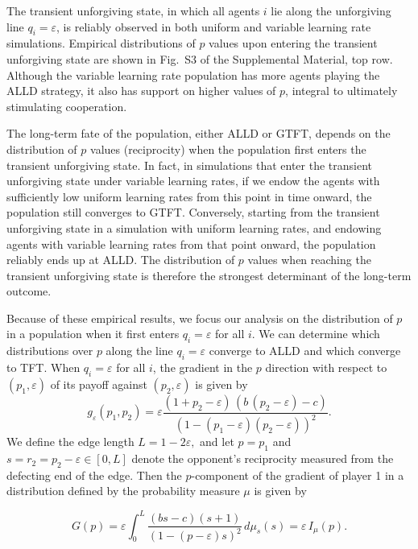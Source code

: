 \documentclass[10pt]{article}
\makeatletter
\newcommand{\eps}{\varepsilon}
\renewcommand\subsection{\@startsection{subsection}{2}{\z@}{-2.5ex \@plus -1ex \@minus -.2ex}{1ex \@plus .2ex}{\sffamily\bfseries\large}}
\makeatother
\begin{document}
\subsection{Transient Unforgiving State}

The transient unforgiving state, in which all agents $i$ lie along the unforgiving line $q_i = \eps$, is reliably observed in both uniform and variable learning rate simulations.
Empirical distributions of $p$ values upon entering the transient unforgiving state are shown in Fig.~S3 of the Supplemental Material, top row. Although the variable learning rate population has more agents playing the ALLD strategy, it also has support on higher values of $p$, integral to ultimately stimulating cooperation.

The long-term fate of the population, either ALLD or GTFT, depends on the distribution of $p$ values (reciprocity) when the population first enters the transient unforgiving state. In fact, in simulations that enter the transient unforgiving state under variable learning rates, if we endow the agents with sufficiently low uniform learning rates from this point in time onward, the population still converges to GTFT. Conversely, starting from the transient unforgiving state in a simulation with uniform learning rates, and endowing agents with variable learning rates from that point onward, the population reliably ends up at ALLD. The distribution of $p$ values when reaching the transient unforgiving state is therefore the strongest determinant of the long-term outcome.

Because of these empirical results, we focus our analysis on the distribution of $p$ in a population when it first enters $q_i = \eps$ for all $i$.
We can determine which distributions over $p$ along the line $q_i= \eps$ converge to ALLD and which converge to TFT. When $q_i = \eps$ for all $i$, the gradient in the $p$ direction with respect to $(p_1, \eps)$ of its payoff against $(p_2, \eps)$ is given by
\[g_\eps(p_1, p_2) = \eps \frac{(1 + p_2 - \eps)\, \left( b\,(p_2 - \eps) - c\right)}{\left(1 - (p_1 -\eps)(p_2 - \eps)\right)^2}.
\]
We define the edge length $L = 1-2\eps,$ and let $p = p_1$ and $s = r_2 = p_2-\eps \in [0,L]$ denote the opponent's reciprocity measured from the defecting end of the edge. Then the $p$-component of the gradient of player 1 in a distribution defined by the probability measure $\mu$ is given by

\[G(p) = \eps \int_0^L \frac{(bs-c)(s+1)}{(1-(p-\eps)s)^2} \, d\mu_s(s) = \eps \, I_\mu(p).\]
\end{document}

